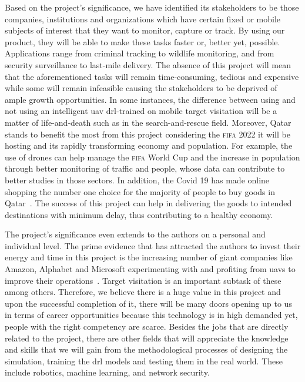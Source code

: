 \documentclass[../main.tex]{subfiles}
\begin{document}
Based on the project's significance, we have identified 
its stakeholders to be 
those companies, institutions and organizations which
have certain fixed or mobile subjects of interest 
that they want to monitor, capture or track.
By using our product,
they will be able to make these tasks faster or,
better yet, possible.
Applications range from criminal tracking 
to wildlife monitoring,
and from security surveillance
to last-mile delivery.
The absence of this project will mean that
the aforementioned tasks will remain
time-consuming, tedious and expensive
while some will remain infeasible
causing the stakeholders to be deprived of ample growth opportunities.
In some instances, the difference between using 
and not using an intelligent \gls{uav} 
\gls{drl}-trained on mobile target visitation
will be a matter of life-and-death
such as in the search-and-rescue field.
Moreover, Qatar stands to benefit the most from this project 
considering the \textsc{fifa} 2022 it will be hosting
and its rapidly transforming economy and population.
For example, the use of drones can help manage 
the \textsc{fifa} World Cup 
and the increase in population through better monitoring 
of traffic and people, whose data can contribute
to better studies in those sectors.
In addition, the Covid 19 has made online shopping
the number one choice for 
the majority of people to buy goods in Qatar~\cite{Has20}.
The success of this project can help in delivering
the goods to intended destinations with minimum delay,
thus contributing to a healthy economy.

The project's significance even extends to the authors
on a personal and individual level.
The prime evidence that has attracted the authors to invest
their energy and time in this project is
the increasing number of giant companies like Amazon, Alphabet
and Microsoft experimenting with and profiting from \glspl{uav}
to improve their operations~\cite{Jun17}.
Target visitation is an important subtask of these among others.
Therefore, we believe there is a huge value
in this project and upon the successful completion of it,
there will be many doors opening up to us in terms of
career opportunities because 
this technology is in high demanded yet, 
people with the right competency
are scarce.
Besides the jobs that are directly related to the project,
there are other fields that will appreciate the knowledge
and skills that we will gain from the methodological processes 
of designing the simulation,
training the \gls{drl} models and testing them in the real world.
These include robotics, machine learning, and 
network security.
\end{document}
